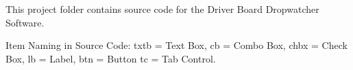 This project folder contains source code for the Driver Board Dropwatcher Software.

Item Naming in Source Code\+: txtb = Text Box, cb = Combo Box, chbx = Check Box, lb = Label, btn = Button tc = Tab Control. 